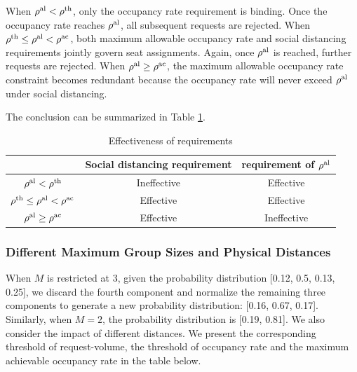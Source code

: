 When $\rho^{\textup{al}} < \rho^{\textup{th}}$, only the occupancy rate requirement is binding. Once the occupancy rate reaches $\rho^{\textup{al}}$, all subsequent requests are rejected. When $\rho^{\textup{th}} \leq \rho^{\textup{al}} < \rho^{\textup{ac}}$, both maximum allowable occupancy rate and social distancing requirements jointly govern seat assignments. Again, once $\rho^{\textup{al}}$ is reached, further requests are rejected. When $\rho^{\textup{al}} \geq \rho^{\textup{ac}}$, the maximum allowable occupancy rate constraint becomes redundant because the occupancy rate will never exceed $\rho^{\textup{al}}$ under social distancing.


The conclusion can be summarized in Table \ref{tab_requirement}.
\begin{table}[ht]
  \centering
  \caption{Effectiveness of requirements}\label{tab_requirement}
  \begin{tabular}{ccc}
  \hline
  \hline
   & Social distancing requirement & requirement of $\rho^{\textup{al}}$ \\
  \hline
  $\rho^{\textup{al}} < \rho^{\textup{th}}$            & Ineffective & Effective \\
  $\rho^{\textup{th}} \leq \rho^{\textup{al}} < \rho^{\textup{ac}}$  & Effective   & Effective \\
  $\rho^{\textup{al}} \geq \rho^{\textup{ac}}$                  & Effective   & Ineffective \\
   \hline
   \hline
  \end{tabular}
\end{table}


\subsubsection{Different Maximum Group Sizes and Physical Distances}
When $M$ is restricted at 3, given the probability distribution [0.12, 0.5, 0.13, 0.25], we discard the fourth component and normalize the remaining three components to generate a new probability distribution: [0.16, 0.67, 0.17]. Similarly, when $M =2$, the probability distribution is [0.19, 0.81].
We also consider the impact of different distances. We present the corresponding threshold of request-volume, the threshold of occupancy rate and the maximum achievable occupancy rate in the table below.

